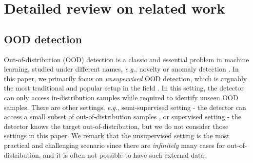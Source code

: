 \documentclass{article}
\newcommand{\eg}{\textit{e}.\textit{g}.}
\begin{document}
 
\clearpage
\section{Detailed review on related work}
\label{appx:related}

\subsection{OOD detection}

Out-of-distribution (OOD) detection is a classic and essential problem in machine learning, studied under different names, \eg, novelty or anomaly detection \citep{hodge2004survey}. In this paper, we primarily focus on \textit{unsupervised} OOD detection, which is arguably the most traditional and popular setup in the field \citep{scholkopf2000support}. In this setting, the detector can only access in-distribution samples while required to identify unseen OOD samples. There are other settings, \eg, semi-supervised setting - the detector can access a small subset of out-of-distribution samples \citep{hendrycks2019deep,ruff2020deep}, or supervised setting - the detector knows the target out-of-distribution, but we do not consider those settings in this paper. We remark that the unsupervised setting is the most practical and challenging scenario since there are \textit{infinitely} many cases for out-of-distribution, and it is often not possible to have such external data.
\end{document}
